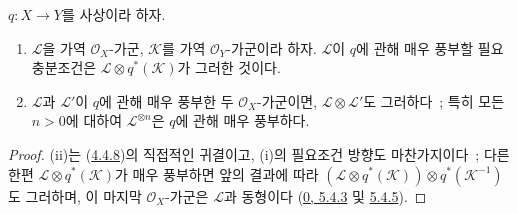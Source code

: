 \begin{corollary}[4.4.9]
\label{II.4.4.9-ko}
$q:X\to Y$를 사상이라 하자.
\begin{enumerate}
  \item[\rm{(i)}] $\mathcal{L}$을 가역 $\mathcal{O}_X$-가군,
  $\mathcal{K}$를 가역 $\mathcal{O}_Y$-가군이라 하자.
  $\mathcal{L}$이 $q$에 관해 매우 풍부할 필요충분조건은
  $\mathcal{L}\otimes q^*(\mathcal{K})$가 그러한 것이다.
  \item[\rm{(ii)}] $\mathcal{L}$과 $\mathcal{L}'$이 $q$에 관해
  매우 풍부한 두 $\mathcal{O}_X$-가군이면,
  $\mathcal{L}\otimes\mathcal{L}'$도 그러하다~; 특히 모든
  $n>0$에 대하여 $\mathcal{L}^{\otimes n}$은 $q$에 관해 매우
  풍부하다.
\end{enumerate}
\end{corollary}

\begin{proof}
(ii)는 (\hyperref[II.4.4.8-ko]{4.4.8})의 직접적인 귀결이고,
(i)의 필요조건 방향도 마찬가지이다~; 다른 한편
$\mathcal{L}\otimes q^*(\mathcal{K})$가 매우 풍부하면 앞의 결과에
따라
$(\mathcal{L}\otimes q^*(\mathcal{K}))\otimes q^*(\mathcal{K}^{-1})$
도 그러하며, 이 마지막 $\mathcal{O}_X$-가군은 $\mathcal{L}$과
동형이다 (\hyperref[0.5.4.3-ko]{0, 5.4.3} 및
\hyperref[0.5.4.5-ko]{5.4.5}).
\end{proof}

